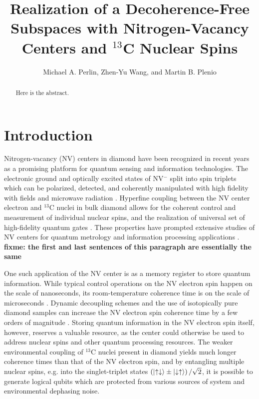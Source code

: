 \documentclass[twocolumn]{revtex4-1}
\newcommand{\p}[1]{\left(#1\right)} %
\renewcommand{\u}{\uparrow}
\renewcommand{\d}{\downarrow}
\newcommand{\fixme}[1]{{\bf \color{red} fixme: #1}}
\begin{document}
\title{Realization of a Decoherence-Free Subspaces with
  Nitrogen-Vacancy Centers and $^{13}$C Nuclear Spins}

\author{Michael A. Perlin, Zhen-Yu Wang, and Martin B. Plenio}


\begin{abstract}
  Here is the abstract.
\end{abstract}

\maketitle

\section{Introduction}

Nitrogen-vacancy (NV) centers in diamond have been recognized in
recent years as a promising platform for quantum sensing and
information technologies. The electronic ground and optically excited
states of NV$^-$ split into spin triplets which can be polarized,
detected, and coherently manipulated with high fidelity with fields
and microwave radiation \cite{dobrovitski2013quantum}. Hyperfine
coupling between the NV center electron and $^{13}$C nuclei in bulk
diamond allows for the coherent control and measurement of individual
nuclear spins, and the realization of universal set of high-fidelity
quantum gates \cite{dobrovitski2013quantum, casanova2016noise}. These
properties have prompted extensive studies of NV centers for quantum
metrology and information processing applications
\cite{mamin2013nanoscale, steinert2010high, wang2015positioning,
  chou2015optimal, childress2006fault, yao2012scalable}. \fixme{the
  first and last sentences of this paragraph are essentially the same}

One such application of the NV center is as a memory register to store
quantum information. While typical control operations on the NV
electron spin happen on the scale of nanoseconds, its room-temperature
coherence time is on the scale of microseconds
\cite{dobrovitski2013quantum}. Dynamic decoupling schemes and the use
of isotopically pure diamond samples can increase the NV electron spin
coherence time by a few orders of magnitude
\cite{ryan2010robust}. Storing quantum information in the NV electron
spin itself, however, reserves a valuable resource, as the center
could otherwise be used to address nuclear spins and other quantum
processing resources. The weaker environmental coupling of $^{13}$C
nuclei present in diamond yields much longer coherence times than that
of the NV electron spin, and by entangling multiple nuclear spins,
e.g. into the singlet-triplet states
$\p{\ket{\u\d}\pm\ket{\d\u}}/\sqrt2$, it is possible to generate
logical qubits which are protected from various sources of system and
environmental dephasing noise.
\end{document}
